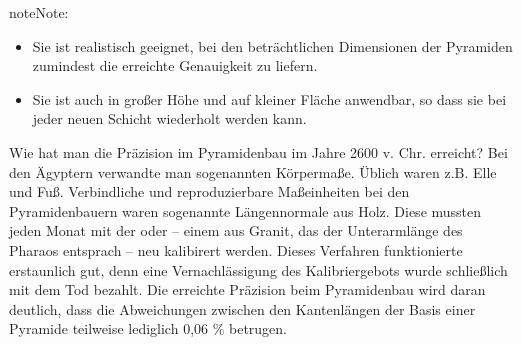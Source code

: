 \documentclass[letterpaper,10pt,english]{jupyterBook}
\begin{document}
\begin{sphinxadmonition}{note}{Note:}
\begin{itemize}
\item {} 
\sphinxAtStartPar
Sie ist realistisch geeignet, bei den beträchtlichen Dimensionen der Pyramiden zumindest die erreichte Genauigkeit zu liefern.

\item {} 
\sphinxAtStartPar
Sie ist auch in großer Höhe und auf kleiner Fläche anwendbar, so dass sie bei jeder neuen Schicht wiederholt werden kann.

\end{itemize}
\end{sphinxadmonition}

\sphinxAtStartPar
Wie hat man die Präzision im Pyramidenbau im Jahre 2600 v. Chr. erreicht? Bei den Ägyptern verwandte man sogenannten Körpermaße. Üblich waren z.B. Elle und Fuß. Verbindliche und reproduzierbare Maßeinheiten bei den Pyramidenbauern waren sogenannte Längennormale aus Holz. Diese  mussten jeden Monat mit der  oder  – einem  aus Granit, das der Unterarmlänge des Pharaos entsprach – neu kalibirert werden.
Dieses Verfahren funktionierte erstaunlich gut, denn eine Vernachlässigung des Kalibriergebots wurde schließlich mit dem Tod bezahlt.
Die erreichte Präzision beim Pyramidenbau wird daran deutlich, dass die Abweichungen zwischen den Kantenlängen der Basis einer Pyramide teilweise lediglich 0,06 \% betrugen.
\end{document}
